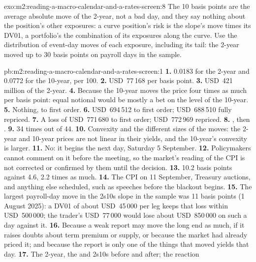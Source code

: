 \begin{solution}{exo:m2:reading-a-macro-calendar-and-a-rates-screen:8}
The 10 basis points are the average absolute move of the 2-year, not a bad day, and they
say nothing about the position's other exposures: a curve position's risk is the slope's
move times its DV01, a portfolio's the combination of its exposures along the curve. Use
the distribution of event-day moves of each exposure, including its tail: the 2-year moved
up to 30 basis points on payroll days in the sample.
\end{solution}

\begin{solution}{pb:m2:reading-a-macro-calendar-and-a-rates-screen:1}
\textbf{1.} 0.0183 for the 2-year and 0.0772 for the 10-year, per 100.
\textbf{2.} USD~77\,168 per basis point.
\textbf{3.} USD~421 million of the 2-year.
\textbf{4.} Because the 10-year moves the price four times as much per basis point:
equal notional would be mostly a bet on the level of the 10-year.
\textbf{5.} Nothing, to first order.
\textbf{6.} USD~694\,512 to first order; USD~688\,510 fully repriced.
\textbf{7.} A loss of USD~771\,680 to first order; USD~772\,969 repriced.
\textbf{8.} , then .
\textbf{9.} 34 times out of 44.
\textbf{10.} Convexity and the different sizes of the moves: the 2-year and 10-year prices
are not linear in their yields, and the 10-year's convexity is larger.
\textbf{11.} No: it begins the next day, Saturday 5 September.
\textbf{12.} Policymakers cannot comment on it before the meeting, so the market's reading
of the CPI is not corrected or confirmed by them until the decision.
\textbf{13.} 10.2 basis points against 4.6, 2.2 times as much.
\textbf{14.} The CPI on 11 September, Treasury auctions, and anything else scheduled, such
as speeches before the blackout begins.
\textbf{15.} The largest payroll-day move in the 2s10s slope in the sample was 11 basis
points (1 August 2025): a DV01 of about USD~45\,000 per leg keeps that loss within
USD~500\,000; the trader's USD~77\,000 would lose about USD~850\,000 on such a day against it.
\textbf{16.} Because a weak report may move the long end as much, if it raises doubts about
term premium or supply, or because the market had already priced it; and because the
report is only one of the things that moved yields that day.
\textbf{17.} The 2-year, the  and 2s10s before and after; the reaction

\end{solution}
